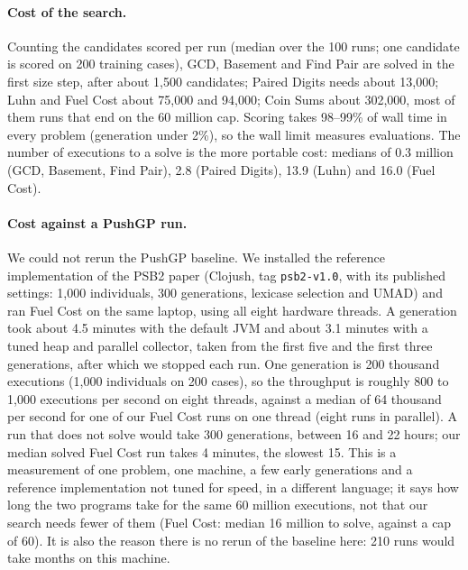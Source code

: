 \documentclass[sigconf,nonacm]{acmart}
\begin{document}
\paragraph{Cost of the search.}
Counting the candidates scored per run (median over the 100 runs; one candidate is scored on 200 training cases), GCD, Basement and Find Pair are solved in the first size step, after about 1,500 candidates; Paired Digits needs about 13,000; Luhn and Fuel Cost about 75,000 and 94,000; Coin Sums about 302,000, most of them runs that end on the 60 million cap. Scoring takes 98--99\% of wall time in every problem (generation under 2\%), so the wall limit measures evaluations. The number of executions to a solve is the more portable cost: medians of 0.3 million (GCD, Basement, Find Pair), 2.8 (Paired Digits), 13.9 (Luhn) and 16.0 (Fuel Cost).

\paragraph{Cost against a PushGP run.}
We could not rerun the PushGP baseline. We installed the reference implementation of the PSB2 paper (Clojush, tag \texttt{psb2-v1.0}, with its published settings: 1,000 individuals, 300 generations, lexicase selection and UMAD) and ran Fuel Cost on the same laptop, using all eight hardware threads. A generation took about 4.5 minutes with the default JVM and about 3.1 minutes with a tuned heap and parallel collector, taken from the first five and the first three generations, after which we stopped each run. One generation is 200 thousand executions (1,000 individuals on 200 cases), so the throughput is roughly 800 to 1,000 executions per second on eight threads, against a median of 64 thousand per second for one of our Fuel Cost runs on one thread (eight runs in parallel). A run that does not solve would take 300 generations, between 16 and 22 hours; our median solved Fuel Cost run takes 4 minutes, the slowest 15. This is a measurement of one problem, one machine, a few early generations and a reference implementation not tuned for speed, in a different language; it says how long the two programs take for the same 60 million executions, not that our search needs fewer of them (Fuel Cost: median 16 million to solve, against a cap of 60). It is also the reason there is no rerun of the baseline here: 210 runs would take months on this machine.
\end{document}
